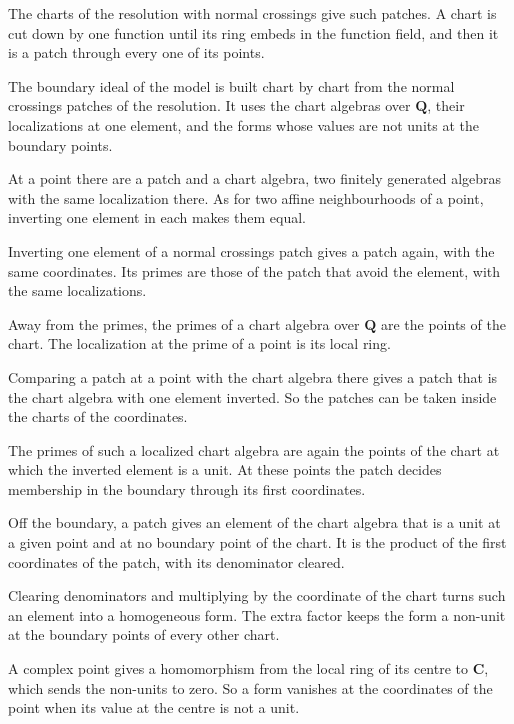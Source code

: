 The charts of the resolution with normal crossings give such patches. A chart is cut down by one function until its ring embeds in
the function field, and then it is a patch through every one of its points.

The boundary ideal of the model is built chart by chart from the normal crossings patches of the resolution. It uses the chart
algebras over $\mathbf Q$, their localizations at one element, and the forms whose values are not units at the boundary points.

At a point there are a patch and a chart algebra, two finitely generated algebras with the same localization there. As for two
affine neighbourhoods of a point, inverting one element in each makes them equal.

Inverting one element of a normal crossings patch gives a patch again, with the same coordinates. Its primes are those of the patch
that avoid the element, with the same localizations.

Away from the primes, the primes of a chart algebra over $\mathbf Q$ are the points of the chart. The localization at the prime of
a point is its local ring.

Comparing a patch at a point with the chart algebra there gives a patch that is the chart algebra with one element inverted. So the
patches can be taken inside the charts of the coordinates.

The primes of such a localized chart algebra are again the points of the chart at which the inverted element is a unit. At these
points the patch decides membership in the boundary through its first coordinates.

Off the boundary, a patch gives an element of the chart algebra that is a unit at a given point and at no boundary point of the
chart. It is the product of the first coordinates of the patch, with its denominator cleared.

Clearing denominators and multiplying by the coordinate of the chart turns such an element into a homogeneous form. The extra factor
keeps the form a non-unit at the boundary points of every other chart.

A complex point gives a homomorphism from the local ring of its centre to $\mathbf C$, which sends the non-units to zero. So a form
vanishes at the coordinates of the point when its value at the centre is not a unit.

